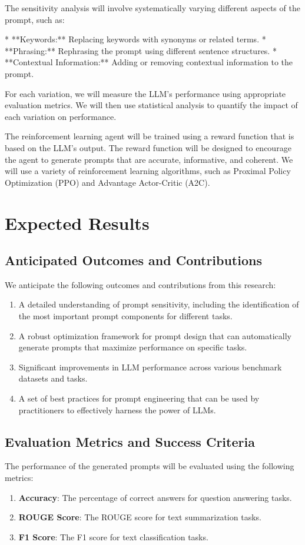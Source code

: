 \documentclass{article}
\begin{document}
The sensitivity analysis will involve systematically varying different aspects of the prompt, such as:

*   **Keywords:** Replacing keywords with synonyms or related terms.
*   **Phrasing:** Rephrasing the prompt using different sentence structures.
*   **Contextual Information:** Adding or removing contextual information to the prompt.

For each variation, we will measure the LLM's performance using appropriate evaluation metrics. We will then use statistical analysis to quantify the impact of each variation on performance.

The reinforcement learning agent will be trained using a reward function that is based on the LLM's output. The reward function will be designed to encourage the agent to generate prompts that are accurate, informative, and coherent. We will use a variety of reinforcement learning algorithms, such as Proximal Policy Optimization (PPO) and Advantage Actor-Critic (A2C).

\section{Expected Results}
\label{sec:expected_results}

\subsection{Anticipated Outcomes and Contributions}
We anticipate the following outcomes and contributions from this research:
\begin{enumerate}
    \item A detailed understanding of prompt sensitivity, including the identification of the most important prompt components for different tasks.
    \item A robust optimization framework for prompt design that can automatically generate prompts that maximize performance on specific tasks.
    \item Significant improvements in LLM performance across various benchmark datasets and tasks.
    \item A set of best practices for prompt engineering that can be used by practitioners to effectively harness the power of LLMs.
\end{enumerate}

\subsection{Evaluation Metrics and Success Criteria}
The performance of the generated prompts will be evaluated using the following metrics:
\begin{enumerate}
    \item \textbf{Accuracy}: The percentage of correct answers for question answering tasks.
    \item \textbf{ROUGE Score}: The ROUGE score for text summarization tasks.
    \item \textbf{F1 Score}: The F1 score for text classification tasks.
\end{enumerate}
\end{document}
